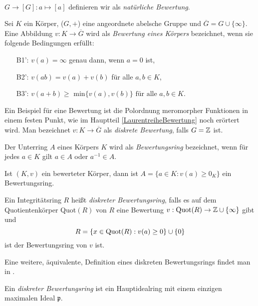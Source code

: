  \\$G \to [G] \colon a \mapsto [a]$ definieren wir als \textit{natürliche Bewertung}. %
\begin{defn}  \label{bewKoerper} %
Sei $K$ ein Körper, ($G, +$) eine angeordnete abelsche Gruppe und $\overline{G}  = G \cup \lbrace\infty\rbrace $. Eine Abbildung $v\colon K \to \overline{G} $ wird als \textit{Bewertung eines Körpers} bezeichnet, wenn sie folgende Bedingungen erfüllt:
\begin{enumerate}
\item[B1':] $v(a) = \infty$ genau dann, wenn $a = 0$ ist,
\item[B2':] $v(ab) = v\left(a\right)+v\left(b\right) $ für alle $ a, b \in K$,
\item[B3':] $v\left(a+b\right) \ge $ min$\lbrace v(a),v\left(b \right)\rbrace \text{ für alle }  a, b \in K. $
\end{enumerate}
\end{defn}
Ein Beispiel für eine Bewertung ist die Polordnung meromorpher Funktionen in einem festen Punkt, wie im Hauptteil \ref*{LaurentreiheBewertung} noch erörtert wird. 
Man bezeichnet $v\colon K \to \overline{G} $ als \textit{diskrete Bewertung}, falls ${G} = \mathbb{Z}$ ist.
%
\begin{defn} %
Der Unterring $A$ eines Körpers $K$ wird als \textit{Bewertungsring} bezeichnet, wenn für jedes $a\in K$ gilt $a \in A$ oder $a^{-1}\in A$.
\end{defn}
\begin{bem}
Ist $\left(K, v\right)$ ein bewerteter Körper, dann ist $A = \lbrace a \in K\colon v(a) \geq 0_K\rbrace$ ein Bewertungsring.
\end{bem}
\begin{defn}   %
Ein Integritätsring $R$ heißt \textit{diskreter Bewertungsring}, falls es auf dem Quotientenkörper \textup{Quot}$(R)$ von $R$ eine Bewertung $v: \textup{Quot}(R) \rightarrow \mathbb{Z} \cup \lbrace\infty\rbrace$ gibt und 
\[R = \lbrace x \in \textup{Quot}(R): v(a) \ge 0 \rbrace \cup \lbrace 0 \rbrace\]
ist der Bewertungsring von $v$ ist.
\end{defn}
Eine weitere, äquivalente, Definition eines diskreten Bewertungsrings findet man in \cite[S. 126]{neukirch92}.
\begin{defn} \label{bewertungsring}%
Ein \textit{diskreter Bewertungsring} ist ein Hauptidealring mit einem einzigen maximalen Ideal $\mathfrak{p}$.
\end{defn} 
%
%
